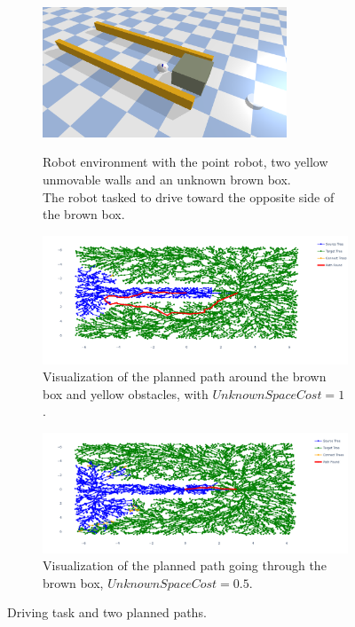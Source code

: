 \begin{figure}[H]
    \centering
    \begin{subfigure}{\textwidth}
    \centering
  \includegraphics[width=0.8\textwidth]{figures/proposed_method/push_or_drive}
    \caption{Robot environment with the point robot, two yellow unmovable walls and an unknown brown box.\\The robot tasked to drive toward the opposite side of the brown box.}\label{subfig:push_or_drive_env}
    \end{subfigure}

    \begin{subfigure}{1.11\textwidth}
    \centering
    \includegraphics[width=\textwidth]{figures/required_background/mp/mp_high_fixed_cost}
    \caption{Visualization of the planned path around the brown box and yellow obstacles, with $\mathit{UnknownSpaceCost} = 1$.}
    \end{subfigure}

    \begin{subfigure}{1.11\textwidth}
    \centering
    \includegraphics[width=\textwidth]{figures/required_background/mp/mp_low_fixed_cost}
    \caption{Visualization of the planned path going through the brown box, $\mathit{UnknownSpaceCost} = 0.5$.}
    \end{subfigure}
    \caption{Driving task and two planned paths.}%
    \label{fig:mp_push_or_drive}
\end{figure}


